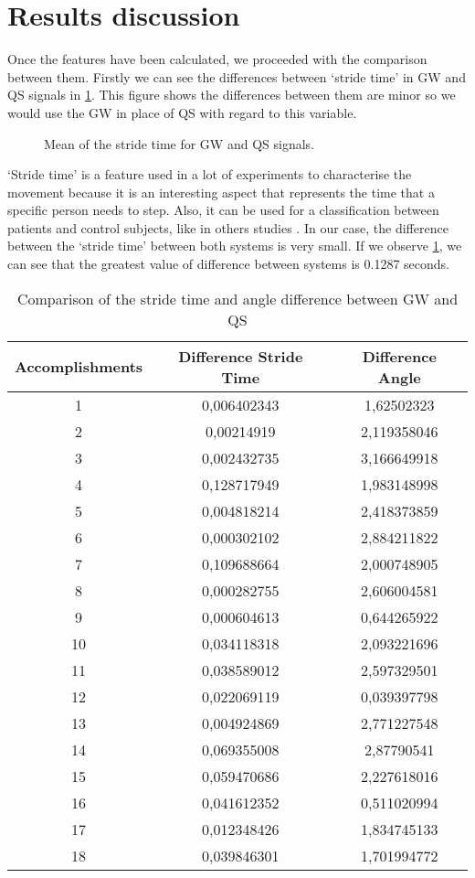 \section{Results discussion}
Once the features have been calculated, we proceeded with the comparison between them. Firstly we can see the differences between ‘stride time’ in GW and QS signals in \ref{fig:mean_stride_time}. This figure shows the differences between them are minor so we would use the GW in place of QS with regard to this variable.

\begin{figure}[H]
	\centering
	\caption{Mean of the stride time for GW and QS signals.}
	\label{fig:mean_stride_time}
\end{figure}

‘Stride time’ is a feature used in a lot of experiments to characterise the movement because it is an interesting aspect that represents the time that a specific person needs to step. Also, it can be used for a classification between patients and control subjects, like in others studies \cite{Hausdorff}.
In our case, the difference between  the ‘stride time’ between both systems is very small. If we observe \ref{tab:Stride_time}, we can see that the greatest value of difference between systems is 0.1287 seconds.

\begin{table}[h]
	\caption{Comparison of the stride time and angle difference between GW and QS}	
	\centering
	\begin{tabular}{|c|c|c|}\hline
		
		Accomplishments & Difference Stride Time	& Difference Angle	 	\\ \hline
		1  & 0,006402343	 & 1,62502323 \\
		2 & 0,00214919	& 2,119358046 \\
		3 & 0,002432735	& 3,166649918 \\
		4 & 0,128717949	& 1,983148998 \\
		5 & 0,004818214	& 2,418373859 \\
		6 & 0,000302102	& 2,884211822 \\
		7 & 0,109688664	& 2,000748905 \\
		8 & 0,000282755	& 2,606004581 \\
		9 & 0,000604613	 & 0,644265922 \\
		10 & 0,034118318	& 2,093221696 \\
		11 & 0,038589012	& 2,597329501 \\
		12 & 0,022069119	& 0,039397798 \\
		13 & 0,004924869	& 2,771227548 \\
		14 & 0,069355008	& 2,87790541 \\
		15 & 0,059470686	& 2,227618016 \\
		16 & 0,041612352	& 0,511020994 \\
		17 & 0,012348426	& 1,834745133 \\
		18 & 0,039846301	& 1,701994772 
	\\ \hline
	\end{tabular}
	\label{tab:Stride_time}
	
\end{table}

